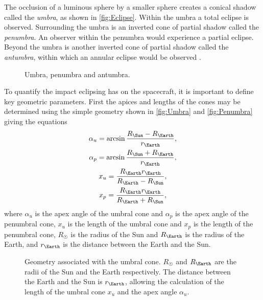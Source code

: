 The occlusion of a luminous sphere by a smaller sphere creates a conical shadow called the \emph{umbra}, as shown in \autoref{fig:Eclipse}. Within the umbra a total eclipse is observed. Surrounding the umbra is an inverted cone of partial shadow called the \emph{penumbra}. An observer within the penumbra would experience a partial eclipse. Beyond the umbra is another inverted cone of partial shadow called the \emph{antumbra}, within which an annular eclipse would be observed \parencite{Longo1995}.

\begin{figure}
\centering
\def\svgwidth{0.85\textwidth}

\caption{Umbra, penumbra and antumbra.} \label{fig:Eclipse}
\end{figure}

To quantify the impact eclipsing has on the spacecraft, it is important to define key geometric parameters. First the apices and lengths of the cones may be determined using the simple geometry shown in \autoref{fig:Umbra} and \autoref{fig:Penumbra} giving the equations 
\begin{subequations} \label{eq:cones}
\begin{gather}
\alpha_u = \arcsin\frac{R_\Sun-R_\Earth}{r_\Earth}, \\
\alpha_p = \arcsin\frac{R_\Sun+R_\Earth}{r_\Earth}, \\
x_u = \frac{R_\Earth r_\Earth}{R_\Earth-R_\Sun}, \\
x_p = \frac{R_\Earth r_\Earth}{R_\Earth+R_\Sun},
\end{gather}
\end{subequations}
where $\alpha_u$ is the apex angle of the umbral cone and $\alpha_p$ is the apex angle of the penumbral cone, $x_u$ is the length of the umbral cone and $x_p$ is the length of the penumbral cone, $R_\Sun$ is the radius of the Sun and $R_\Earth$ is the radius of the Earth, and $r_\Earth$ is the distance between the Earth and the Sun.

\begin{figure}
\centering
\def\svgwidth{\textwidth}

\caption{Geometry associated with the umbral cone. $R_\Sun$ and $R_\Earth$ are the radii of the Sun and the Earth respectively. The distance between the Earth and the Sun is $r_\Earth$, allowing the calculation of the length of the umbral cone $x_u$ and the apex angle $\alpha_u$.} \label{fig:Umbra}
\end{figure}

